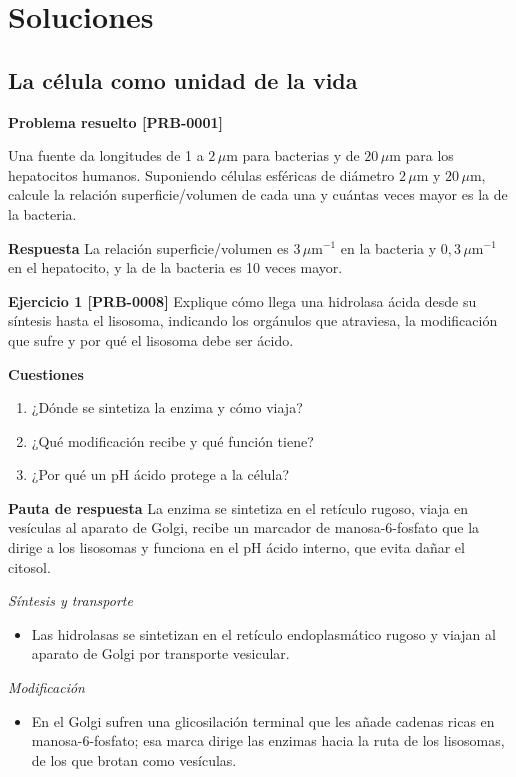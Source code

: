 \documentclass{book}
\begin{document}
\chapter{Soluciones}

\section{La célula como unidad de la vida}

\noindent\textbf{Problema resuelto [PRB-0001]}

Una fuente da longitudes de 1 a \(2\,\mu\mathrm{m}\) para bacterias y de \(20\,\mu\mathrm{m}\) para los hepatocitos humanos. Suponiendo células esféricas de diámetro \(2\,\mu\mathrm{m}\) y \(20\,\mu\mathrm{m}\), calcule la relación superficie/volumen de cada una y cuántas veces mayor es la de la bacteria.


\noindent\textbf{Respuesta}
La relación superficie/volumen es \(3\,\mu\mathrm{m}^{-1}\) en la bacteria y \(0{,}3\,\mu\mathrm{m}^{-1}\) en el hepatocito, y la de la bacteria es 10 veces mayor.


\noindent\textbf{Ejercicio 1 [PRB-0008]}
Explique cómo llega una hidrolasa ácida desde su síntesis hasta el lisosoma, indicando los orgánulos que atraviesa, la modificación que sufre y por qué el lisosoma debe ser ácido.


\noindent\textbf{Cuestiones}
\begin{enumerate}
\item ¿Dónde se sintetiza la enzima y cómo viaja?
\item ¿Qué modificación recibe y qué función tiene?
\item ¿Por qué un pH ácido protege a la célula?
\end{enumerate}

\noindent\textbf{Pauta de respuesta}
La enzima se sintetiza en el retículo rugoso, viaja en vesículas al aparato de Golgi, recibe un marcador de manosa-6-fosfato que la dirige a los lisosomas y funciona en el pH ácido interno, que evita dañar el citosol.


\noindent\textit{Síntesis y transporte}
\begin{itemize}
\item Las hidrolasas se sintetizan en el retículo endoplasmático rugoso y viajan al aparato de Golgi por transporte vesicular.
\end{itemize}

\noindent\textit{Modificación}
\begin{itemize}
\item En el Golgi sufren una glicosilación terminal que les añade cadenas ricas en manosa-6-fosfato; esa marca dirige las enzimas hacia la ruta de los lisosomas, de los que brotan como vesículas.
\end{itemize}
\end{document}
